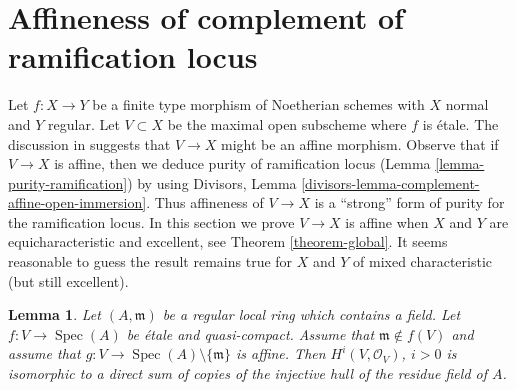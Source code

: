 \documentclass{stacks-project}
\theoremstyle{plain}
\newtheorem{lemma}[subsection]{Lemma}
\theoremstyle{definition}
\theoremstyle{remark}
\numberwithin{equation}{subsection}
\def\Spec{\mathop{\mathrm{Spec}}}
\begin{document}
\section{Affineness of complement of ramification locus}
\label{section-stronger-purity}

\noindent
Let $f : X \to Y$ be a finite type morphism of Noetherian schemes
with $X$ normal and $Y$ regular. Let $V \subset X$ be the maximal
open subscheme where $f$ is \'etale.
The discussion in \cite[Chapter IV, Section 21.12]{EGA}
suggests that $V \to X$ might be an affine morphism.
Observe that if $V \to X$ is affine, then we deduce purity of
ramification locus (Lemma \ref{lemma-purity-ramification}) by
using Divisors, Lemma \ref{divisors-lemma-complement-affine-open-immersion}.
Thus affineness of $V \to X$ is a ``strong'' form of purity
for the ramification locus.
In this section we prove $V \to X$ is affine when
$X$ and $Y$ are equicharacteristic and excellent, see
Theorem \ref{theorem-global}. It seems reasonable
to guess the result remains true for $X$ and $Y$
of mixed characteristic (but still excellent).

\begin{lemma}
\label{lemma-structure-cohomology}
Let $(A, \mathfrak m)$ be a regular local ring which contains a field.
Let $f : V \to \Spec(A)$ be \'etale and quasi-compact.
Assume that $\mathfrak m \not \in f(V)$ and assume that
$g : V \to \Spec(A) \setminus \{\mathfrak m\}$ is affine.
Then $H^i(V, \mathcal{O}_V)$, $i > 0$ is isomorphic to a direct
sum of copies of the injective hull of the residue field of $A$.
\end{lemma}
\end{document}
